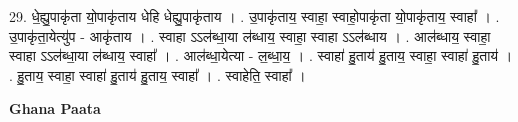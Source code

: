 \documentclass[17pt]{extarticle}
\begin{document}
29. धे॒ह्यु॒पाकृ॑ता यो॒पाकृ॑ताय धेहि धेह्यु॒पाकृ॑ताय । . उ॒पाकृ॑ताय॒ स्वाहा॒ स्वाहो॒पाकृ॑ता यो॒पाकृ॑ताय॒ स्वाहा᳚ । . उ॒पाकृ॑ता॒येत्यु॑प - आकृ॑ताय । . स्वाहा ऽऽल॑ब्धा॒या ल॑ब्धाय॒ स्वाहा॒ स्वाहा ऽऽल॑ब्धाय । . आल॑ब्धाय॒ स्वाहा॒ स्वाहा ऽऽल॑ब्धा॒या ल॑ब्धाय॒ स्वाहा᳚ । . आल॑ब्धा॒येत्या - ल॒ब्धा॒य॒ । . स्वाहा॑ हु॒ताय॑ हु॒ताय॒ स्वाहा॒ स्वाहा॑ हु॒ताय॑ । . हु॒ताय॒ स्वाहा॒ स्वाहा॑ हु॒ताय॑ हु॒ताय॒ स्वाहा᳚ । . स्वाहेति॒ स्वाहा᳚ । \newline

\textbf{Ghana Paata } \newline
\end{document}
